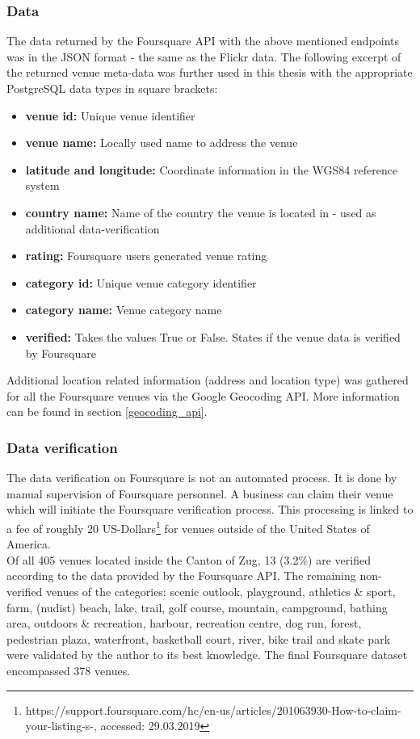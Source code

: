\subsubsection*{Data} \label{fq_data}
The data returned by the Foursquare API with the above mentioned endpoints was in the JSON format - the same as the Flickr data.
The following excerpt of the returned venue meta-data was further used in this thesis with the appropriate PostgreSQL data types in square brackets: \\
\begin{itemize}[label={}]
    \item \textbf{venue id:} Unique venue identifier 
    \item \textbf{venue name:} Locally used name to address the venue 
    \item \textbf{latitude and longitude:} Coordinate information in the WGS84 reference system 
    \item \textbf{country name:} Name of the country the venue is located in - used as additional data-verification 
    \item \textbf{rating:} Foursquare users generated venue rating 
    \item \textbf{category id:} Unique venue category identifier 
    \item \textbf{category name:} Venue category name 
    \item \textbf{verified:} Takes the values True or False. States if the venue data is verified by Foursquare 
\end{itemize}

Additional location related information (address and location type) was gathered for all the Foursquare venues via the Google Geocoding API. More information can be found in section \ref{geocoding_api}.

\subsubsection*{Data verification} \label{foursquare_data_verification}
The data verification on Foursquare is not an automated process. It is done by manual supervision of Foursquare personnel. A business can claim their venue which will initiate the Foursquare verification process. This processing is linked to a fee of roughly 20 US-Dollars\footnote{https://support.foursquare.com/hc/en-us/articles/201063930-How-to-claim-your-listing-s-, accessed: 29.03.2019} for venues outside of the United States of America. \\
Of all 405 venues located inside the Canton of Zug, 13 (3.2\%) are verified according to the data provided by the Foursquare API. The remaining non-verified venues of the categories: scenic outlook, playground, athletics \& sport, farm, (nudist) beach, lake, trail, golf course, mountain, campground, bathing area, outdoors \& recreation, harbour, recreation centre, dog run, forest, pedestrian plaza, waterfront, basketball court, river, bike trail and skate park were validated by the author to its best knowledge. The final Foursquare dataset encompassed 378 venues.

